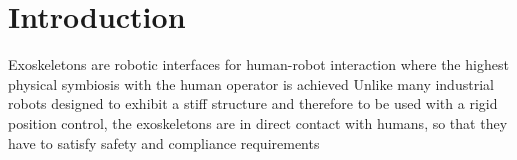 \section{Introduction}

Exoskeletons are robotic interfaces for human-robot interaction where the highest physical symbiosis with the human operator is achieved 
\DIFdelbegin {}\DIFdelend \DIFaddbegin {}\DIFaddend Unlike many industrial robots  designed to exhibit a stiff structure and \DIFaddbegin {}\DIFaddend therefore to be used with a rigid position control, the exoskeletons are in direct contact with humans, so that  they have to satisfy  safety and compliance requirements \DIFdelbegin {}\DIFdelend \DIFaddbegin {}\par {} \DIFadd{: 
}



